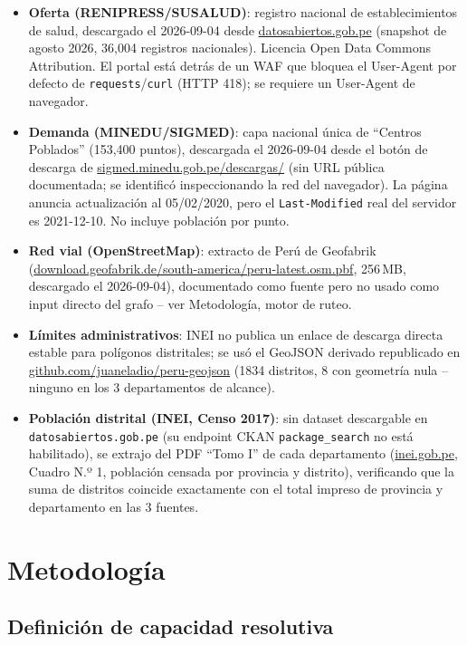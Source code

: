 \documentclass[11pt]{article}
\begin{document}
\begin{itemize}
  \item \textbf{Oferta (RENIPRESS/SUSALUD)}: registro nacional de
  establecimientos de salud, descargado el 2026-09-04 desde
  \url{datosabiertos.gob.pe} (snapshot de agosto 2026, 36{,}004 registros
  nacionales). Licencia Open Data Commons Attribution. El portal está
  detrás de un WAF que bloquea el User-Agent por defecto de
  \texttt{requests}/\texttt{curl} (HTTP 418); se requiere un User-Agent de
  navegador.
  \item \textbf{Demanda (MINEDU/SIGMED)}: capa nacional única de ``Centros
  Poblados'' (153{,}400 puntos), descargada el 2026-09-04 desde el botón de
  descarga de \url{sigmed.minedu.gob.pe/descargas/} (sin URL pública
  documentada; se identificó inspeccionando la red del navegador). La
  página anuncia actualización al 05/02/2020, pero el \texttt{Last-Modified}
  real del servidor es 2021-12-10. No incluye población por punto.
  \item \textbf{Red vial (OpenStreetMap)}: extracto de Perú de Geofabrik
  (\url{download.geofabrik.de/south-america/peru-latest.osm.pbf},
  256\,MB, descargado el 2026-09-04), documentado como fuente pero no usado
  como input directo del grafo -- ver Metodología, motor de ruteo.
  \item \textbf{Límites administrativos}: INEI no publica un enlace de
  descarga directa estable para polígonos distritales; se usó el GeoJSON
  derivado republicado en \url{github.com/juaneladio/peru-geojson} (1834
  distritos, 8 con geometría nula -- ninguno en los 3 departamentos de
  alcance).
  \item \textbf{Población distrital (INEI, Censo 2017)}: sin dataset
  descargable en \texttt{datosabiertos.gob.pe} (su endpoint CKAN
  \texttt{package\_search} no está habilitado), se extrajo del PDF
  ``Tomo I'' de cada departamento (\url{inei.gob.pe}, Cuadro N.º 1,
  población censada por provincia y distrito), verificando que la suma de
  distritos coincide exactamente con el total impreso de provincia y
  departamento en las 3 fuentes.
\end{itemize}

\section{Metodología}

\subsection{Definición de capacidad resolutiva}
\end{document}
